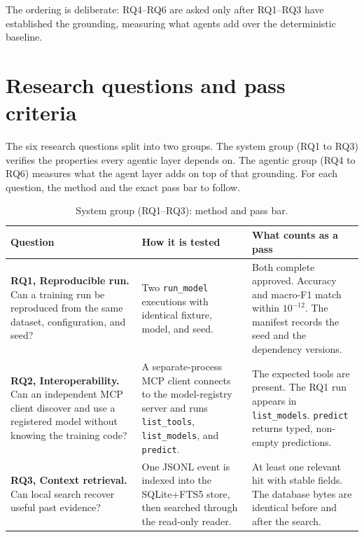 The ordering is deliberate: RQ4--RQ6 are asked only after RQ1--RQ3 have established the grounding, measuring what agents add over the deterministic baseline.


\section{Research questions and pass criteria}
\label{sec:rq-criteria}

The six research questions split into two groups. The system group (RQ1 to RQ3) verifies the properties every agentic layer depends on. The agentic group (RQ4 to RQ6) measures what the agent layer adds on top of that grounding. For each question, the method and the exact pass bar to follow.

\begin{table}[H]
\centering
\caption{System group (RQ1--RQ3): method and pass bar.}
\label{tab:rq-system}
\footnotesize
\begin{tabular}{>{\raggedright\arraybackslash}p{3.4cm}>{\raggedright\arraybackslash}p{5.2cm}>{\raggedright\arraybackslash}p{5.2cm}}
\toprule
\textbf{Question} & \textbf{How it is tested} & \textbf{What counts as a pass} \\
\midrule
\textbf{RQ1, Reproducible run.} Can a training run be reproduced from the same dataset, configuration, and seed? &
Two \texttt{run\_model} executions with identical fixture, model, and seed. &
Both complete approved. Accuracy and macro-F1 match within $10^{-12}$. The manifest records the seed and the dependency versions. \\
\addlinespace
\textbf{RQ2, Interoperability.} Can an independent MCP client discover and use a registered model without knowing the training code? &
A separate-process MCP client connects to the model-registry server and runs \texttt{list\_tools}, \texttt{list\_models}, and \texttt{predict}. &
The expected tools are present. The RQ1 run appears in \texttt{list\_models}. \texttt{predict} returns typed, non-empty predictions. \\
\addlinespace
\textbf{RQ3, Context retrieval.} Can local search recover useful past evidence? &
One JSONL event is indexed into the SQLite+FTS5 store, then searched through the read-only reader. &
At least one relevant hit with stable fields. The database bytes are identical before and after the search. \\
\bottomrule
\end{tabular}
\end{table}

